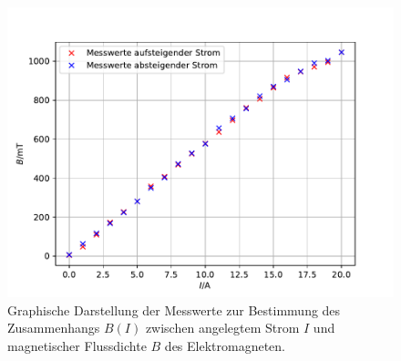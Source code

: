 \begin{figure}
  \centering
  \includegraphics[width = \textwidth]{../Messdaten/plots/hysterese_data.pdf}
  \caption{Graphische Darstellung der Messwerte zur Bestimmung des Zusammenhangs $B(I)$ zwischen angelegtem Strom $I$ und
  magnetischer Flussdichte $B$ des Elektromagneten.}
  \label{fig: hysterese_gesamt}
\end{figure}
